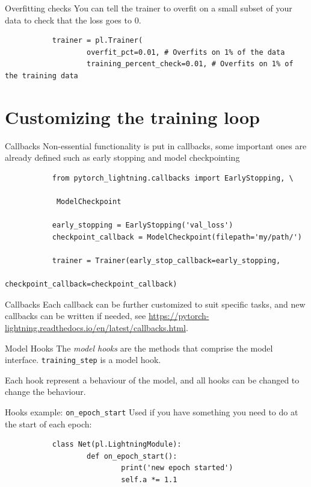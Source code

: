 \documentclass[aspectratio=169]{beamer}
\begin{document}
	\begin{frame}[fragile]{Overfitting checks}
		You can tell the trainer to overfit on a small subset of your data to check that the loss goes to 0.
		\begin{verbatim}
		   trainer = pl.Trainer(
				   overfit_pct=0.01, # Overfits on 1% of the data
				   training_percent_check=0.01, # Overfits on 1% of the training data
		\end{verbatim}
	\end{frame}

	\section{Customizing the training loop}

	\begin{frame}[fragile]{Callbacks}
		Non-essential functionality is put in callbacks, some important ones are already defined such as early stopping and model checkpointing
		\begin{verbatim}
		   from pytorch_lightning.callbacks import EarlyStopping, \

			ModelCheckpoint

		   early_stopping = EarlyStopping('val_loss')
		   checkpoint_callback = ModelCheckpoint(filepath='my/path/')

		   trainer = Trainer(early_stop_callback=early_stopping,
											 checkpoint_callback=checkpoint_callback)
		\end{verbatim}

	\end{frame}

	\begin{frame}{Callbacks}
		Each callback can be further customized to suit specific tasks, and new callbacks can be written if needed, see \small\url{https://pytorch-lightning.readthedocs.io/en/latest/callbacks.html}.
	\end{frame}

	\begin{frame}[fragile]{Model Hooks}
		The \emph{model hooks} are the methods that comprise the model interface. \texttt{training\_step} is a model hook.

		Each hook represent a behaviour of the model, and all hooks can be changed to change the behaviour.
	\end{frame}

	\begin{frame}[fragile]{Hooks example: \texttt{on\_epoch\_start}}
		Used if you have something you need to do at the start of each epoch:

		\begin{verbatim}
		   class Net(pl.LightningModule):
				   def on_epoch_start():
						   print('new epoch started')
						   self.a *= 1.1
		\end{verbatim}
	\end{frame}
\end{document}

